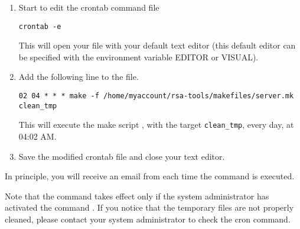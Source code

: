 \documentclass[12pt,a4paper, twoside]{scrreprt} %
\begin{document}
\begin{enumerate}
\item Start to edit the crontab command file

\begin{verbatim}
crontab -e
\end{verbatim}

This will open your  file with your default text editor
(this default editor can be specified with the environment variable
EDITOR or VISUAL).

\item Add the following line to the  file. 

\begin{verbatim}
02 04 * * * make -f /home/myaccount/rsa-tools/makefiles/server.mk clean_tmp
\end{verbatim}

This will execute the make script , with the target
\texttt{clean\_tmp}, every day, at 04:02 AM. 

\item Save the modified crontab file and close your text editor.

\end{enumerate}

In principle, you will receive an email from  each
time the command is executed.

Note that the command  takes effect only if the
system administrator has activated the command . If you
notice that the temporary files are not properly cleaned, please
contact your system administrator to check the cron command.
\end{document}

